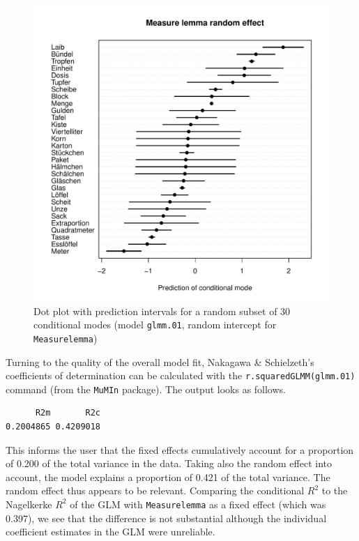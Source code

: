 \begin{figure}
  \centering
  \includegraphics[width=\textwidth]{RPHCL/ranef_selection}
  \caption{Dot plot with prediction intervals for a random subset of 30 conditional modes (model \texttt{glmm.01}, random intercept for \texttt{Measurelemma})}
  \label{fig:condmodes}
\end{figure}

Turning to the quality of the overall model fit, Nakagawa \& Schielzeth's coefficients of determination can be calculated with the \texttt{r.squaredGLMM(glmm.01)} command (from the \texttt{MuMIn} package).
The output looks as follows.

\vspace{0.5\baselineskip}

\begin{lstlisting}
      R2m       R2c
0.2004865 0.4209018
\end{lstlisting}

This informs the user that the fixed effects cumulatively account for a proportion of 0.200 of the total variance in the data.
Taking also the random effect into account, the model explains a proportion of 0.421 of the total variance.
The random effect thus appears to be relevant.
Comparing the conditional $R^2$ to the Nagelkerke $R^2$ of the GLM with \texttt{Measurelemma} as a fixed effect (which was 0.397), we see that the difference is not substantial although the individual coefficient estimates in the GLM were unreliable.

